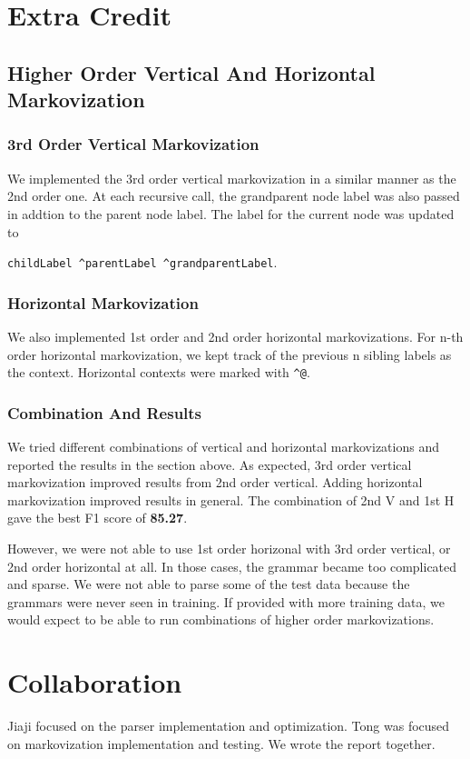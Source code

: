 \documentclass[12pt]{article}
\begin{document}
\section{Extra Credit}
\subsection{Higher Order Vertical And Horizontal Markovization}
\subsubsection{3rd Order Vertical Markovization}
We implemented the 3rd order vertical markovization in a similar manner as the 2nd order one. At each recursive call, the grandparent node label was also passed in addtion to the parent node label. The label for the current node was updated to

\texttt{childLabel \string^parentLabel \string^grandparentLabel}. 
\subsubsection{Horizontal Markovization}
We also implemented 1st order and 2nd order horizontal markovizations. For n-th order horizontal markovization, we kept track of the previous n sibling labels as the context. Horizontal contexts were marked with \texttt{\string^@}.

\subsubsection{Combination And Results}
We tried different combinations of vertical and horizontal markovizations and reported the results in the section above. As expected, 3rd order vertical markovization improved results from 2nd order vertical. Adding horizontal markovization improved results in general. The combination of 2nd V and 1st H gave the best F1 score of \textbf{85.27}.

However, we were not able to use 1st order horizonal with 3rd order vertical, or 2nd order horizontal at all. In those cases, the grammar became too complicated and sparse. We were not able to parse some of the test data because the grammars were never seen in training. If provided with more training data, we would expect to be able to run combinations of higher order markovizations.

\section{Collaboration} 
Jiaji focused on the parser implementation and optimization. Tong was focused on markovization implementation and testing. We wrote the report together.
\end{document}
